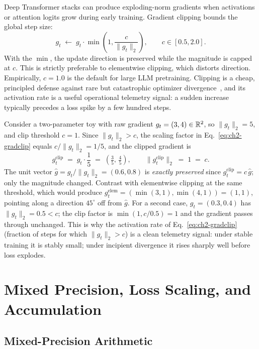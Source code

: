 Deep Transformer stacks can produce exploding-norm gradients when
activations or attention logits grow during early training. Gradient
clipping bounds the global step size:
\begin{equation}
\label{eq:ch2-gradclip}
g_t \;\leftarrow\; g_t \cdot \min\!\left(1, \frac{c}{\|g_t\|_2}\right),
\qquad c \in [0.5, 2.0].
\end{equation}
With the $\min$, the update direction is preserved while the magnitude
is capped at $c$. This is strictly preferable to elementwise clipping,
which distorts direction. Empirically, $c = 1.0$ is the default for
large LLM pretraining. Clipping is a cheap, principled defense against
rare but catastrophic optimizer divergence~\citep{pascanu2013difficulty},
and its activation rate is a useful operational telemetry signal: a
sudden increase typically precedes a loss spike by a few hundred steps.

\begin{workedexample}
Consider a two-parameter toy with raw gradient
$g_t = (3, 4) \in \mathbb{R}^{2}$, so $\|g_t\|_2 = 5$, and clip threshold
$c = 1$. Since $\|g_t\|_2 > c$, the scaling factor in
Eq.~\eqref{eq:ch2-gradclip} equals $c / \|g_t\|_2 = 1/5$, and the
clipped gradient is
\[
g_t^{\mathrm{clip}}
  \;=\; g_t \cdot \frac{1}{5}
  \;=\; \left(\tfrac{3}{5},\,\tfrac{4}{5}\right),
\qquad
\|g_t^{\mathrm{clip}}\|_2 \;=\; 1 \;=\; c.
\]
The unit vector $\hat g = g_t / \|g_t\|_2 = (0.6, 0.8)$ is \emph{exactly
preserved} since $g_t^{\mathrm{clip}} = c\,\hat g$; only the magnitude
changed. Contrast with elementwise clipping at the same threshold,
which would produce $g_t^{\mathrm{elem}} = (\min(3,1), \min(4,1)) = (1,1)$,
pointing along a direction $45^{\circ}$ off from $\hat g$. For a
second case, $g_t = (0.3, 0.4)$ has $\|g_t\|_2 = 0.5 < c$; the clip
factor is $\min(1, c/0.5) = 1$ and the gradient passes through
unchanged. This is why the activation rate of Eq.~\eqref{eq:ch2-gradclip}
(fraction of steps for which $\|g_t\|_2 > c$) is a clean telemetry
signal: under stable training it is stably small; under incipient
divergence it rises sharply well before loss explodes.
\end{workedexample}

\section{Mixed Precision, Loss Scaling, and Accumulation}

\subsection{Mixed-Precision Arithmetic}

